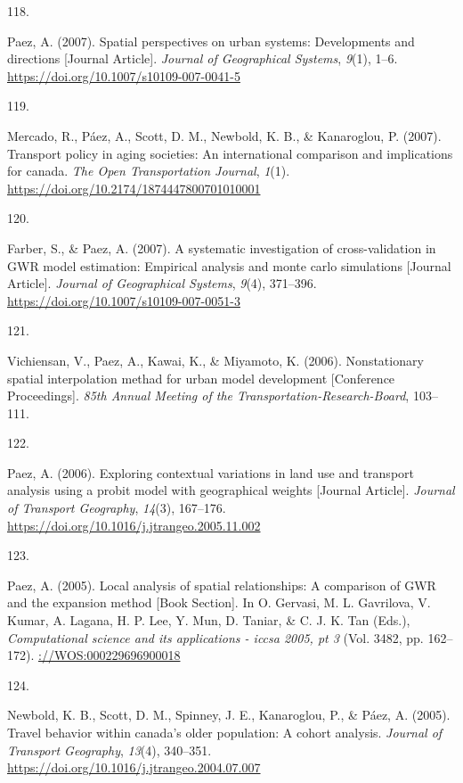 \documentclass[10pt,a4paper,]{twentysecondcv}
\newlength{\csllabelwidth}
\newcommand{\CSLLeftMargin}[1]{\parbox[t]{\csllabelwidth}{#1}}
\newcommand{\CSLRightInline}[1]{\parbox[t]{\linewidth - \csllabelwidth}{#1}}
\begin{document}
\leavevmode{}%
\CSLLeftMargin{118. }%
\CSLRightInline{Paez, A. (2007). Spatial perspectives on urban systems:
Developments and directions {[}Journal Article{]}. \emph{Journal of
Geographical Systems}, \emph{9}(1), 1--6.
\url{https://doi.org/10.1007/s10109-007-0041-5}}

\leavevmode{}%
\CSLLeftMargin{119. }%
\CSLRightInline{Mercado, R., Páez, A., Scott, D. M., Newbold, K. B., \&
Kanaroglou, P. (2007). Transport policy in aging societies: An
international comparison and implications for canada. \emph{The Open
Transportation Journal}, \emph{1}(1).
\url{https://doi.org/10.2174/1874447800701010001}}

\leavevmode{}%
\CSLLeftMargin{120. }%
\CSLRightInline{Farber, S., \& Paez, A. (2007). A systematic
investigation of cross-validation in GWR model estimation: Empirical
analysis and monte carlo simulations {[}Journal Article{]}.
\emph{Journal of Geographical Systems}, \emph{9}(4), 371--396.
\url{https://doi.org/10.1007/s10109-007-0051-3}}

\leavevmode{}%
\CSLLeftMargin{121. }%
\CSLRightInline{Vichiensan, V., Paez, A., Kawai, K., \& Miyamoto, K.
(2006). Nonstationary spatial interpolation methad for urban model
development {[}Conference Proceedings{]}. \emph{85th Annual Meeting of
the Transportation-Research-Board}, 103--111.}

\leavevmode{}%
\CSLLeftMargin{122. }%
\CSLRightInline{Paez, A. (2006). Exploring contextual variations in land
use and transport analysis using a probit model with geographical
weights {[}Journal Article{]}. \emph{Journal of Transport Geography},
\emph{14}(3), 167--176.
\url{https://doi.org/10.1016/j.jtrangeo.2005.11.002}}

\leavevmode{}%
\CSLLeftMargin{123. }%
\CSLRightInline{Paez, A. (2005). Local analysis of spatial
relationships: A comparison of GWR and the expansion method {[}Book
Section{]}. In O. Gervasi, M. L. Gavrilova, V. Kumar, A. Lagana, H. P.
Lee, Y. Mun, D. Taniar, \& C. J. K. Tan (Eds.), \emph{Computational
science and its applications - iccsa 2005, pt 3} (Vol. 3482, pp.
162--172). \url{://WOS:000229696900018}}

\leavevmode{}%
\CSLLeftMargin{124. }%
\CSLRightInline{Newbold, K. B., Scott, D. M., Spinney, J. E.,
Kanaroglou, P., \& Páez, A. (2005). Travel behavior within canada's
older population: A cohort analysis. \emph{Journal of Transport
Geography}, \emph{13}(4), 340--351.
\url{https://doi.org/10.1016/j.jtrangeo.2004.07.007}}
\end{document}
